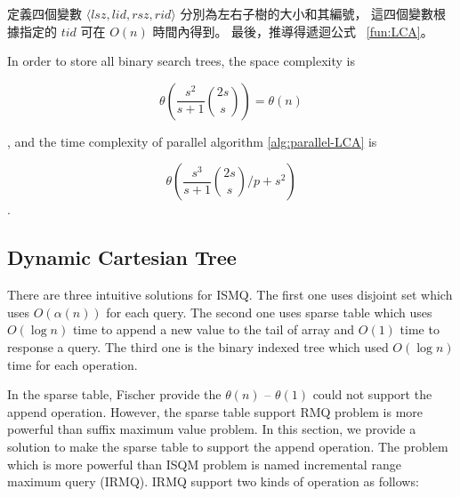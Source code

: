 定義四個變數 $\langle\mathit{lsz},\mathit{lid},\mathit{rsz},\mathit{rid}\rangle$ 分別為左右子樹的大小和其編號，
這四個變數根據指定的 $\mathit{tid}$ 可在 $O(n)$ 時間內得到。
最後，推導得遞迴公式 ~\ref{fun:LCA}。 
\fi



In order to store all binary search trees, the space complexity is 

\begin{equation}
\theta\left(\frac{s^2}{s+1} \binom{2s}{s}\right) = \theta\left(n\right)
\end{equation}

, and the time complexity of parallel algorithm \ref{alg:parallel-LCA}
is

\begin{equation}
\theta\left(\frac{s^3}{s+1} \binom{2s}{s} \bigg/ p + s^2 \right)
\end{equation}.

\iffalse
為記錄所有的二元搜尋樹的 LCA，空間消耗 $\theta\left(\frac{s^2}{s+1} \binom{2s}{s}\right) = \theta\left(n\right)$；
其平行算法 \ref{alg:parallel-LCA} 的時間複雜度如下：

\begin{equation}
\theta\left(\frac{s^3}{s+1} \binom{2s}{s} \bigg/ p + s^2 \right)
\end{equation}.
\fi



\subsection{Dynamic Cartesian Tree}

There are three intuitive solutions for ISMQ.  The first one uses
disjoint set which uses $O(\alpha(n))$ for each query.  The second one
uses sparse table which uses $O(\log n)$ time to append a new value to
the tail of array and $O(1)$ time to response a query.  The third one
is the binary indexed tree which used $O(\log n)$ time for each
operation.

In the sparse table, Fischer provide the $\theta(n)$ -- $\theta(1)$
could not support the append operation.  However, the sparse table
support RMQ problem is more powerful than suffix maximum value
problem.  In this section, we provide a solution to make the sparse
table to support the append operation.  The problem which is more
powerful than ISQM problem is named incremental range maximum query
(IRMQ).  IRMQ support two kinds of operation as follows:

